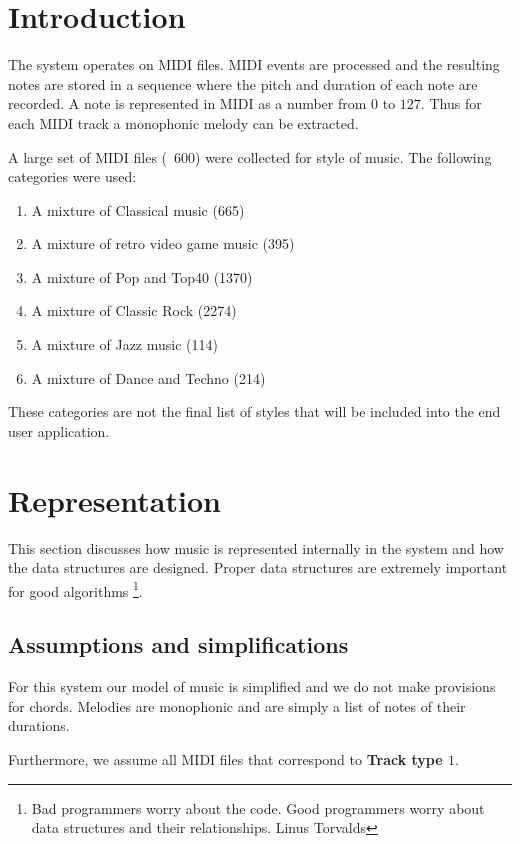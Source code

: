 

\chapter{Introduction}
The system operates on MIDI files. MIDI events are processed and the resulting notes are stored in a sequence where the pitch and duration of each note are recorded. A note is represented in MIDI as a number from $0$ to $127$.
Thus for each MIDI track a monophonic melody can be extracted.

A large set of MIDI files (~600) were collected for style of music. The following categories were used:
\begin{enumerate}
\item A mixture of Classical music (665)
\item A mixture of retro video game music (395)
\item A mixture of Pop and Top40 (1370)
\item A mixture of Classic Rock (2274)
\item A mixture of Jazz music (114)
\item A mixture of Dance and Techno (214)
\end{enumerate}

These categories are not the final list of styles that will be included into the end user application.


\chapter{Representation}
This section discusses how music is represented internally in the system and how the data structures are designed. 
Proper data structures are extremely important for good algorithms \footnote{Bad programmers worry about the code. Good programmers worry about data structures and their relationships. Linus Torvalds}.

\section{Assumptions and simplifications}
For this system our model of music is simplified and we do not make provisions for chords. Melodies are monophonic and are simply a list of notes of their durations.

Furthermore, we assume all MIDI files that correspond to \textbf{Track type $1$}.

